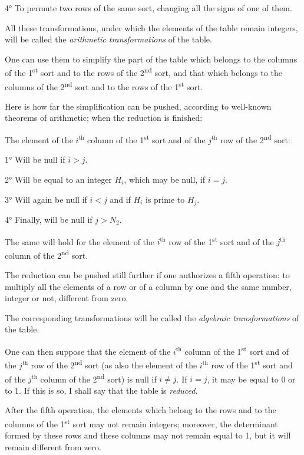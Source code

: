 \documentclass{article}
\begin{document}

4° To permute two rows of the same sort, changing all the signs of one of them.

All these transformations, under which the elements of the table remain integers, will be called the \emph{arithmetic transformations} of the table.

One can use them to simplify the part of the table which belongs to the columns of the 1\textsuperscript{st} sort and to the rows of the 2\textsuperscript{nd} sort, and that which belongs to the columns of the 2\textsuperscript{nd} sort and to the rows of the 1\textsuperscript{st} sort.

Here is how far the simplification can be pushed, according to well-known theorems of arithmetic; when the reduction is finished:

The element of the $i^{\text{th}}$ column of the 1\textsuperscript{st} sort and of the $j^{\text{th}}$ row of the 2\textsuperscript{nd} sort:

1° Will be null if $i > j$.

2° Will be equal to an integer $H_{i}$, which may be null, if $i = j$.

3° Will again be null if $i < j$ and if $H_{i}$ is prime to $H_{j}$.

4° Finally, will be null if $j > N_{2}$.

The same will hold for the element of the $i^{\text{th}}$ row of the 1\textsuperscript{st} sort and of the $j^{\text{th}}$ column of the 2\textsuperscript{nd} sort.

The reduction can be pushed still further if one authorizes a fifth operation: to multiply all the elements of a row or of a column by one and the same number, integer or not, different from zero.

The corresponding transformations will be called the \emph{algebraic transformations} of the table.

One can then suppose that the element of the $i^{\text{th}}$ column of the 1\textsuperscript{st} sort and of the $j^{\text{th}}$ row of the 2\textsuperscript{nd} sort (as also the element of the $i^{\text{th}}$ row of the 1\textsuperscript{st} sort and of the $j^{\text{th}}$ column of the 2\textsuperscript{nd} sort) is null if $i \neq j$. If $i = j$, it may be equal to 0 or to 1. If this is so, I shall say that the table is \emph{reduced}.

After the fifth operation, the elements which belong to the rows and to the columns of the 1\textsuperscript{st} sort may not remain integers; moreover, the determinant formed by these rows and these columns may not remain equal to 1, but it will remain different from zero.
\end{document}
